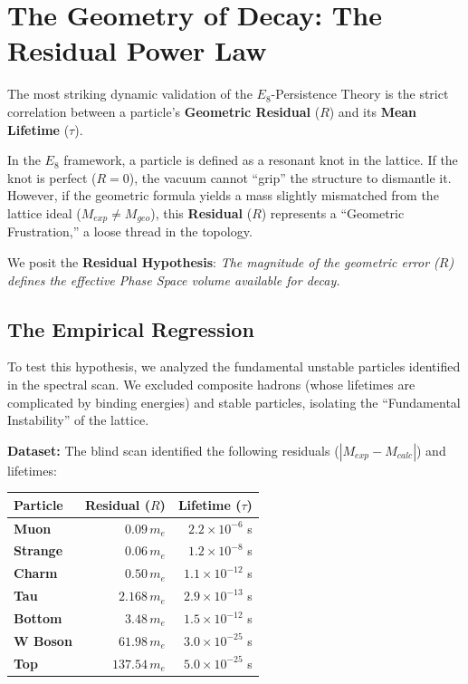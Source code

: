 \section{The Geometry of Decay: The Residual Power Law}

The most striking dynamic validation of the $E_8$-Persistence Theory is the strict correlation between a particle's \textbf{Geometric Residual} ($R$) and its \textbf{Mean Lifetime} ($\tau$).

In the $E_8$ framework, a particle is defined as a resonant knot in the lattice. If the knot is perfect ($R=0$), the vacuum cannot ``grip'' the structure to dismantle it. However, if the geometric formula yields a mass slightly mismatched from the lattice ideal ($M_{exp} \neq M_{geo}$), this \textbf{Residual} ($R$) represents a ``Geometric Frustration,'' a loose thread in the topology.

We posit the \textbf{Residual Hypothesis}: \textit{The magnitude of the geometric error ($R$) defines the effective Phase Space volume available for decay.}

\subsection{The Empirical Regression}

To test this hypothesis, we analyzed the fundamental unstable particles identified in the spectral scan. We excluded composite hadrons (whose lifetimes are complicated by binding energies) and stable particles, isolating the ``Fundamental Instability'' of the lattice.

\textbf{Dataset:} The blind scan identified the following residuals ($|M_{exp} - M_{calc}|$) and lifetimes:

\begin{table}[h]
\centering
\begin{tabular}{lrr}
\toprule
\textbf{Particle} & \textbf{Residual ($R$)} & \textbf{Lifetime ($\tau$)} \\ \midrule
\textbf{Muon}     & $0.09 \, m_e$           & $2.2 \times 10^{-6}$ s \\
\textbf{Strange}  & $0.06 \, m_e$           & $1.2 \times 10^{-8}$ s \\
\textbf{Charm}    & $0.50 \, m_e$           & $1.1 \times 10^{-12}$ s \\
\textbf{Tau}      & $2.168 \, m_e$          & $2.9 \times 10^{-13}$ s \\
\textbf{Bottom}   & $3.48 \, m_e$           & $1.5 \times 10^{-12}$ s \\
\textbf{W Boson}  & $61.98 \, m_e$          & $3.0 \times 10^{-25}$ s \\
\textbf{Top}      & $137.54 \, m_e$         & $5.0 \times 10^{-25}$ s \\ \bottomrule
\end{tabular}
\end{table}

